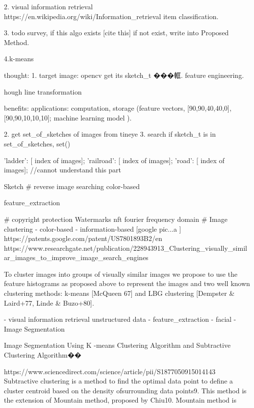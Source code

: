 2. visual information retrieval
https://en.wikipedia.org/wiki/Information_retrieval
item classification.


3. todo survey, if this algo exists [cite this]
if not exist, write into Proposed Method.

4.k-means





thought:
1. target image: opencv get its sketch_t ���軭.  feature engineering.

hough line transformation

benefits:
applications:
computation, storage (feature vectors, [90,90,40,40,0], [90,90,10,10,10];
        machine learning model ).

2. get set_of_sketches of images from tineye
3. search if sketch_t is in set_of_sketches, set()

{
'ladder': [ index of images];
'railroad': [ index of images];
'road': [ index of images];
}
//cannot understand this part
















Sketch
# reverse image searching
    color-based

    feature_extraction   

# copyright protection
    Watermarks  nft fourier frequency domain
# Image clustering
    - color-based
    - information-based [google pic...a ]
    https://patents.google.com/patent/US7801893B2/en  
    https://www.researchgate.net/publication/228943913_Clustering_visually_similar_images_to_improve_image_search_engines  {

To cluster images into groups of visually similar images we propose to use the feature histograms as proposed above to represent the images and two well known clustering methods: k-means [McQueen 67] and LBG clustering [Dempster & Laird+77, Linde & Buzo+80]. 
    }
        - visual information retrieval
         unstructured data
        - feature_extraction   
        - facial 
        - Image Segmentation  

Image Segmentation Using K -means Clustering Algorithm and Subtractive Clustering Algorithm��{
https://www.sciencedirect.com/science/article/pii/S1877050915014143
Subtractive clustering is a method to find the optimal data point to define a cluster centroid based on the density ofsurrounding data points9. This method is the extension of Mountain method, proposed by Chiu10. Mountain method is

}




